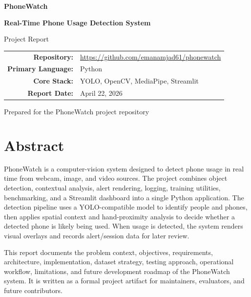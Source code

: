 \documentclass[12pt,a4paper]{report}
\newcommand{\projectname}{PhoneWatch}
\newcommand{\projectrepo}{\url{https://github.com/emanamjad61/phonewatch}}
\begin{document}
\begin{titlepage}
  \centering
  \vspace*{1.0cm}
  {\Huge\bfseries\color{PhoneWatchSlate} PhoneWatch\par}
  \vspace{0.35cm}
  {\Large\bfseries Real-Time Phone Usage Detection System\par}
  \vspace{1.2cm}
  {\large Project Report\par}
  \vfill
  \begin{tabular}{>{\bfseries}rl}
    Repository: & \projectrepo \\
    Primary Language: & Python \\
    Core Stack: & YOLO, OpenCV, MediaPipe, Streamlit \\
    Report Date: & April 22, 2026 \\
  \end{tabular}
  \vfill
  {\large Prepared for the PhoneWatch project repository\par}
  \vspace*{1.0cm}
\end{titlepage}


\chapter*{Abstract}

\projectname{} is a computer-vision system designed to detect phone usage in real time from webcam, image, and video sources. The project combines object detection, contextual analysis, alert rendering, logging, training utilities, benchmarking, and a Streamlit dashboard into a single Python application. The detection pipeline uses a YOLO-compatible model to identify people and phones, then applies spatial context and hand-proximity analysis to decide whether a detected phone is likely being used. When usage is detected, the system renders visual overlays and records alert/session data for later review.

This report documents the problem context, objectives, requirements, architecture, implementation, dataset strategy, testing approach, operational workflow, limitations, and future development roadmap of the \projectname{} system. It is written as a formal project artifact for maintainers, evaluators, and future contributors.

\tableofcontents
\listoftables
\end{document}
